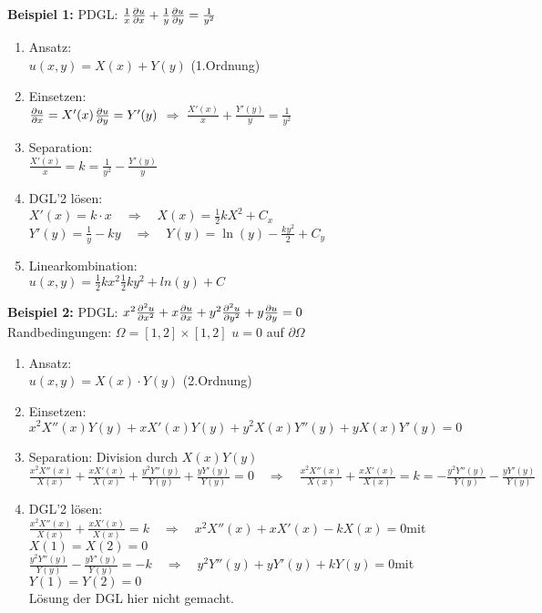 \begin{minipage}{0.49\textwidth}
\textbf{Beispiel 1: } PDGL: $\frac1x\frac{\partial u}{\partial x}+\frac1y\frac{\partial u}{\partial y}=\frac{1}{y^2}$
\begin{enumerate}
	\item Ansatz:\\[0.4cm]
	$u(x,y)=X(x) + Y(y)$ (1.Ordnung)
	\item Einsetzen:\\[0.4cm]
	$\frac{\partial u}{\partial x}=X'(x)$\qquad $\frac{\partial u}{\partial y}=Y'(y)$ \quad $\Rightarrow$ \quad $\frac{X'(x)}{x}+\frac{Y'(y)}{y}=\frac{1}{y^2}$
	\item Separation:\\[0.4cm]
	$\frac{X'(x)}{x}=k=\frac{1}{y^2}-\frac{Y'(y)}{y}$
	\item DGL'2 lösen:\\[0.4cm]
	$X'(x)=k\cdot x \quad\Rightarrow\quad X(x)=\frac12 kX^2+C_x$\\
	$Y'(y)=\frac1y-ky \quad\Rightarrow\quad Y(y)=\ln(y)-\frac{ky^2}{2}+C_y$
	\item Linearkombination:\\[0.4cm]
	$u(x,y)=\frac12 kx^2\frac12 ky^2+ln(y)+C$
\end{enumerate}

\textbf{Beispiel 2: } PDGL: $x^2\frac{\partial ^2u}{\partial x^2}+x\frac{\partial u}{\partial x}+y^2\frac{\partial ^2u}{\partial y^2}+y\frac{\partial u}{\partial y}=0$\\ 
Randbedingungen: $\Omega=[1,2]\times[1,2]$ \qquad $u=0$ auf $\partial\Omega$
\begin{enumerate}
	\item Ansatz:\\[0.4cm]
	$u(x,y)=X(x) \cdot Y(y)$ (2.Ordnung)
	\item Einsetzen:\\[0.4cm]
	$x^2X''(x)Y(y)+xX'(x)Y(y)+y^2X(x)Y''(y)+yX(x)Y'(y)=0$
	\item Separation: Division durch $X(x)Y(y)$\\[0.4cm]
	$\frac{x^2X''(x)}{X(x)}+\frac{xX'(x)}{X(x)}+\frac{y^2Y''(y)}{Y(y)}+\frac{yY'(y)}{Y(y)}=0\quad\Rightarrow\quad \frac{x^2X''(x)}{X(x)}+\frac{xX'(x)}{X(x)}=k=-\frac{y^2Y''(y)}{Y(y)}-\frac{yY'(y)}{Y(y)}$
	\item DGL'2 lösen:\\[0.4cm]
	$\frac{x^2X''(x)}{X(x)}+\frac{xX'(x)}{X(x)}=k\quad\Rightarrow\quad x^2X''(x)+xX'(x)-kX(x)=0$\qquad mit $X(1)=X(2)=0$\\
	$\frac{y^2Y''(y)}{Y(y)}-\frac{yY'(y)}{Y(y)}=-k\quad\Rightarrow\quad y^2Y''(y)+yY'(y)+kY(y)=0$\qquad mit $Y(1)=Y(2)=0$\\[0.4cm]
	Lösung der DGL hier nicht gemacht.
\end{enumerate}
\end{minipage}
